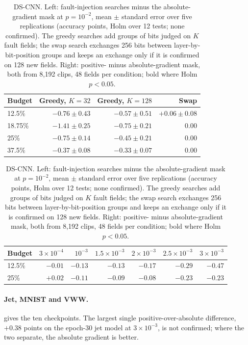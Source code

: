 \begin{table}[h]
\caption{DS-CNN. Left: fault-injection searches minus the absolute-gradient mask at $p=10^{-2}$, mean $\pm$ standard error over five replications (accuracy points, Holm over 12 tests; none confirmed). The greedy searches add groups of bits judged on $K$ fault fields; the swap search exchanges 256 bits between layer-by-bit-position groups and keeps an exchange only if it is confirmed on 128 new fields. Right: positive- minus absolute-gradient mask, both from 8,192 clips, 48 fields per condition; bold where Holm $p<0.05$.}\label{tab:kwsfollow}
\centering\footnotesize\setlength{\tabcolsep}{4pt}
\begin{tabular}{l r r r}\toprule
Budget & Greedy, $K=32$ & Greedy, $K=128$ & Swap\\\midrule
12.5\% & $-0.76\pm0.43$ & $-0.57\pm0.51$ & $+0.06\pm0.08$\\
18.75\% & $-1.41\pm0.25$ & $-0.75\pm0.21$ & $0.00$\\
25\% & $-0.75\pm0.14$ & $-0.45\pm0.21$ & $0.00$\\
37.5\% & $-0.37\pm0.08$ & $-0.33\pm0.07$ & $0.00$\\\bottomrule
\end{tabular}\hfill
\begin{tabular}{l r r r r r r}\toprule
Budget & $3\!\times\!10^{-4}$ & $10^{-3}$ & $1.5\!\times\!10^{-3}$ & $2\!\times\!10^{-3}$ & $2.5\!\times\!10^{-3}$ & $3\!\times\!10^{-3}$\\\midrule
12.5\% & $-0.01$ & $-0.13$ & $-0.13$ & $-0.17$ & $\mathbf{-0.29}$ & $\mathbf{-0.47}$\\
25\% & $+0.02$ & $\mathbf{-0.11}$ & $-0.09$ & $-0.08$ & $\mathbf{-0.23}$ & $\mathbf{-0.23}$\\\bottomrule
\end{tabular}
\end{table}

\paragraph{Jet, MNIST and VWW.}  gives the ten checkpoints. The largest single positive-over-absolute difference, $+0.38$ points on the epoch-30 jet model at $3\times10^{-3}$, is not confirmed; where the two separate, the absolute gradient is better.

